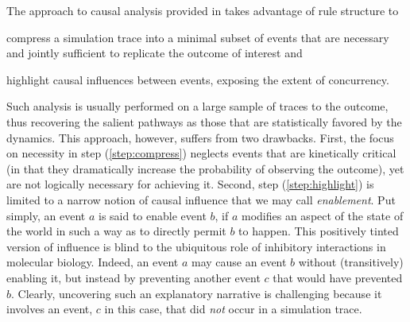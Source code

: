 The approach to causal analysis provided in
\cite{DBLP:conf/fsttcs/DanosFFHH12,DanosEtAl-CONCUR07} takes advantage
of rule structure to
\begin{inparaenum}[(i)]
\item \label{step:compress} compress a simulation trace into a minimal
  subset of events that are necessary and jointly sufficient to
  replicate the outcome of interest and
\item \label{step:highlight} highlight causal influences between
  events, exposing the extent of concurrency.
\end{inparaenum}
Such analysis is usually performed on a large sample of traces to the
outcome, thus recovering the salient pathways as those that are
statistically favored by the dynamics. This approach, however, suffers
from two drawbacks. First, the focus on necessity in step
(\ref{step:compress}) neglects events that are kinetically critical
(in that they dramatically increase the probability of observing the
outcome), yet are not logically necessary for achieving it. Second,
step (\ref{step:highlight}) is limited to a narrow notion of causal
influence that we may call \emph{enablement}. Put simply, an event $a$
is said to enable event $b$, if $a$ modifies an aspect of the state of
the world in such a way as to directly permit $b$ to happen. This
positively tinted version of influence is blind to the ubiquitous role
of inhibitory interactions in molecular biology.  Indeed, an event $a$
may cause an event $b$ without (transitively) enabling it, but instead
by preventing another event $c$ that would have prevented
$b$. Clearly, uncovering such an explanatory narrative is challenging
because it involves an event, $c$ in this case, that did \emph{not}
occur in a simulation trace.

